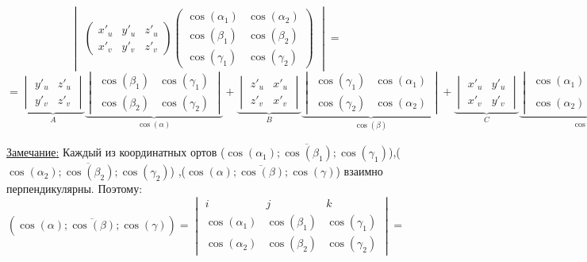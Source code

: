 \documentclass[12pt]{article}
\begin{document}
  \[\begin{vmatrix}
    \begin{pmatrix}
      x'_u & y'_u & z'_u\\
      x'_v & y'_v & z'_v
    \end{pmatrix}
    \begin{pmatrix}
      \cos(\alpha_1)& \cos(\alpha_2)\\
      \cos(\beta_1)&\cos(\beta_2)\\
      \cos(\gamma_1)&\cos(\gamma_2)
    \end{pmatrix}
  \end{vmatrix}=\]
  \[=\underbrace{\begin{vmatrix}
    y'_u & z'_u\\
    y'_v & z'_v
  \end{vmatrix}}_{A}
  \underbrace{\begin{vmatrix}
    \cos(\beta_1) & \cos(\gamma_1)\\
    \cos(\beta_2) & \cos(\gamma_2)
  \end{vmatrix}}_{\cos(\alpha)}
  +
  \underbrace{\begin{vmatrix}
    z'_u&x'_u\\
    z'_v&x'_v
  \end{vmatrix}}_{B}
  \underbrace{\begin{vmatrix}
    \cos(\gamma_1) & \cos(\alpha_1)\\
    \cos(\gamma_2)&\cos(\alpha_2)
  \end{vmatrix}}_{\cos(\beta)}
  +
  \underbrace{\begin{vmatrix}
    x'_u & y'_u\\
    x'_v & y'_v
  \end{vmatrix}}_{C}
  \underbrace{\begin{vmatrix}
    \cos(\alpha_1)&\cos(\beta_1)\\
    \cos(\alpha_2)&\cos(\beta_2)
  \end{vmatrix}}_{\cos(\gamma)}
  \boxed{=}\]
  \par
  \underline{Замечание:} Каждый из координатных ортов ($\overline{\cos(\alpha_1);\cos(\beta_1);\cos(\gamma_1)}$),($\overline{\cos(\alpha_2);\cos(\beta_2);\cos(\gamma_2)}$)
  ,($\overline{\cos(\alpha);\cos(\beta);\cos(\gamma)}$) взаимно перпендикулярны.
  Поэтому:
  \[(\overline{\cos(\alpha);\cos(\beta);\cos(\gamma)}) = 
  \begin{vmatrix}
    i&j&k\\
    \cos(\alpha_1)&\cos(\beta_1)&\cos(\gamma_1)\\
    \cos(\alpha_2)&\cos(\beta_2)&\cos(\gamma_2)
  \end{vmatrix}=\]
\end{document}
